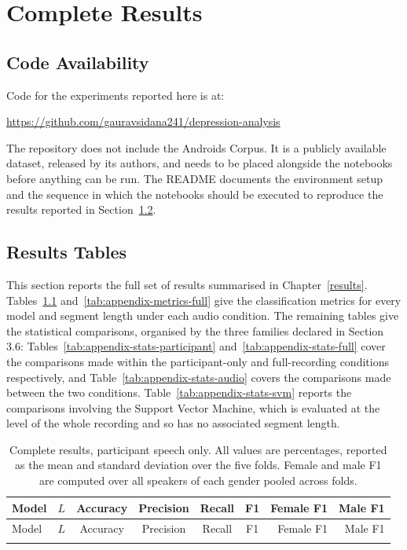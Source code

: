 \documentclass{mproj}
\begin{document}
\appendix %
\chapter{Complete Results}\label{app:full-results}

\section{Code Availability}\label{sec:code}

Code for the experiments reported here is at:

\url{https://github.com/gauravsidana241/depression-analysis}

The repository does not include the Androids Corpus. It is a publicly
available dataset, released by its authors, and needs to be placed alongside
the notebooks before anything can be run. The README documents the environment
setup and the sequence in which the notebooks should be executed to reproduce
the results reported in Section~\ref{sec:results-tables}.

\section{Results Tables}\label{sec:results-tables}

This section reports the full set of results summarised in Chapter~\ref{results}. Tables~\ref{tab:appendix-metrics-participant} and~\ref{tab:appendix-metrics-full} give the classification metrics for every model and segment length under each audio condition. The remaining tables give the statistical comparisons, organised by the three families declared in Section 3.6: Tables~\ref{tab:appendix-stats-participant} and~\ref{tab:appendix-stats-full} cover the comparisons made within the participant-only and full-recording conditions respectively, and Table~\ref{tab:appendix-stats-audio} covers the comparisons made between the two conditions. Table~\ref{tab:appendix-stats-svm} reports the comparisons involving the Support Vector Machine, which is evaluated at the level of the whole recording and so has no associated segment length.

{\small\setlength{\tabcolsep}{3pt}
\begin{longtable}{llccccrr}
  \caption{Complete results, participant speech only. All values are
  percentages, reported as the mean and standard deviation over the five folds.
  Female and male F1 are computed over all speakers of each gender pooled
  across folds.}
  \label{tab:appendix-metrics-participant} \\
  \toprule
  Model & $L$ & Accuracy & Precision & Recall & F1 & Female F1 & Male F1 \\
  \midrule
  \endfirsthead
  \toprule
  Model & $L$ & Accuracy & Precision & Recall & F1 & Female F1 & Male F1 \\
  \midrule
  \endhead
  \bottomrule
  \endfoot
  
\end{longtable}}
\end{document}
